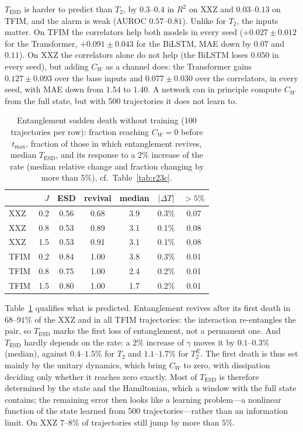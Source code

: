 \documentclass[twocolumn,10pt]{article}
\begin{document}
$T_\mathrm{ESD}$ is harder to predict than $T_2$, by $0.3$--$0.4$ in
$R^2$ on XXZ and $0.03$--$0.13$ on TFIM, and the alarm is weak (AUROC
$0.57$--$0.81$). Unlike for $T_2$, the inputs matter. On TFIM the
correlators help both models in every seed ($+0.027 \pm 0.012$ for the
Transformer, $+0.091 \pm 0.043$ for the BiLSTM, MAE down by $0.07$ and
$0.11$). On XXZ the correlators alone do not help (the BiLSTM loses
$0.050$ in every seed), but adding $C_W$ as a channel does: the
Transformer gains $0.127 \pm 0.093$ over the base inputs and
$0.077 \pm 0.030$ over the correlators, in every seed, with MAE down from
$1.54$ to $1.40$. A network can in principle compute $C_W$ from the full
state, but with 500 trajectories it does not learn to.

\begin{table}[h]
\centering
\caption{Entanglement sudden death without training (100 trajectories per
  row): fraction reaching $C_W = 0$ before $t_\mathrm{max}$, fraction of
  those in which entanglement revives, median $T_\mathrm{ESD}$, and its
  response to a $2\%$ increase of the rate (median relative change and
  fraction changing by more than $5\%$), cf.\
  Table~\ref{tab:r23c}.\label{tab:r24b}}
\footnotesize
\setlength{\tabcolsep}{2.5pt}
\begin{tabular}{lrccccc}
\toprule
 & $J$ & ESD & revival & median & $|\Delta T|$ & $>5\%$ \\
\midrule
XXZ & 0.2 & 0.56 & 0.68 & 3.9 & 0.3\% & 0.07 \\
XXZ & 0.8 & 0.53 & 0.89 & 3.1 & 0.1\% & 0.08 \\
XXZ & 1.5 & 0.53 & 0.91 & 3.1 & 0.1\% & 0.08 \\
TFIM & 0.2 & 0.84 & 1.00 & 3.8 & 0.3\% & 0.01 \\
TFIM & 0.8 & 0.75 & 1.00 & 2.4 & 0.2\% & 0.01 \\
TFIM & 1.5 & 0.80 & 1.00 & 1.7 & 0.2\% & 0.01 \\
\bottomrule
\end{tabular}
\end{table}

Table~\ref{tab:r24b} qualifies what is predicted. Entanglement revives
after its first death in $68$--$91\%$ of the XXZ and in all TFIM
trajectories: the interaction re-entangles the pair, so $T_\mathrm{ESD}$
marks the first loss of entanglement, not a permanent one. And
$T_\mathrm{ESD}$ hardly depends on the rate: a $2\%$ increase of
$\gamma$ moves it by $0.1$--$0.3\%$ (median), against $0.4$--$1.5\%$ for
$T_2$ and $1.1$--$1.7\%$ for $T_2^E$. The first death is thus set mainly
by the unitary dynamics, which bring $C_W$ to zero, with dissipation
deciding only whether it reaches zero exactly. Most of
$T_\mathrm{ESD}$ is therefore determined by the state and the
Hamiltonian, which a window with the full state contains; the remaining
error then looks like a learning problem---a nonlinear function of the
state learned from 500 trajectories---rather than an information limit.
On XXZ $7$--$8\%$ of trajectories still jump by more than $5\%$.
\end{document}
